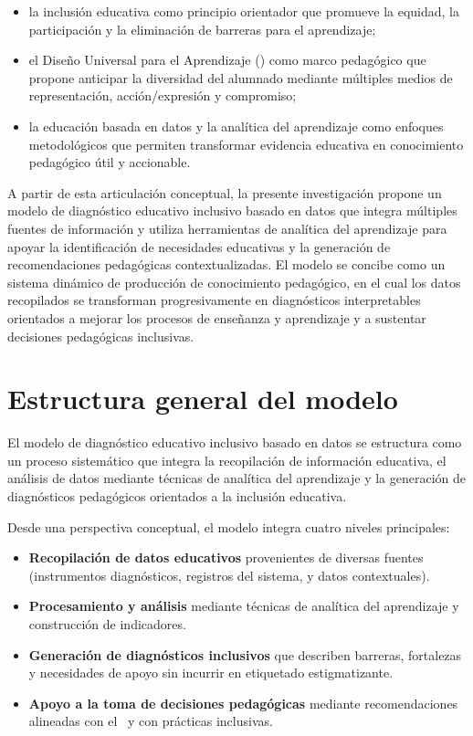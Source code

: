\begin{refsection}
\begin{itemize}
\item la inclusión educativa como principio orientador que promueve la equidad, la participación y la eliminación de barreras para el aprendizaje;
\item el Diseño Universal para el Aprendizaje (\DUA) como marco pedagógico que propone anticipar la diversidad del alumnado mediante múltiples medios de representación, acción/expresión y compromiso;
\item la educación basada en datos y la analítica del aprendizaje como enfoques metodológicos que permiten transformar evidencia educativa en conocimiento pedagógico útil y accionable.
\end{itemize}

A partir de esta articulación conceptual, la presente investigación propone un modelo de diagnóstico educativo inclusivo basado en datos que integra múltiples fuentes de información y utiliza herramientas de analítica del aprendizaje para apoyar la identificación de necesidades educativas y la generación de recomendaciones pedagógicas contextualizadas. El modelo se concibe como un sistema dinámico de producción de conocimiento pedagógico, en el cual los datos recopilados se transforman progresivamente en diagnósticos interpretables orientados a mejorar los procesos de enseñanza y aprendizaje y a sustentar decisiones pedagógicas inclusivas.

\section{Estructura general del modelo}

El modelo de diagnóstico educativo inclusivo basado en datos se estructura como un proceso sistemático que integra la recopilación de información educativa, el análisis de datos mediante técnicas de analítica del aprendizaje y la generación de diagnósticos pedagógicos orientados a la inclusión educativa.

Desde una perspectiva conceptual, el modelo integra cuatro niveles principales:

\begin{itemize}
\item \textbf{Recopilación de datos educativos} provenientes de diversas fuentes (instrumentos diagnósticos, registros del sistema, y datos contextuales).
\item \textbf{Procesamiento y análisis} mediante técnicas de analítica del aprendizaje y construcción de indicadores.
\item \textbf{Generación de diagnósticos inclusivos} que describen barreras, fortalezas y necesidades de apoyo sin incurrir en etiquetado estigmatizante.
\item \textbf{Apoyo a la toma de decisiones pedagógicas} mediante recomendaciones alineadas con el \DUA\ y con prácticas inclusivas.
\end{itemize}


\end{refsection}
